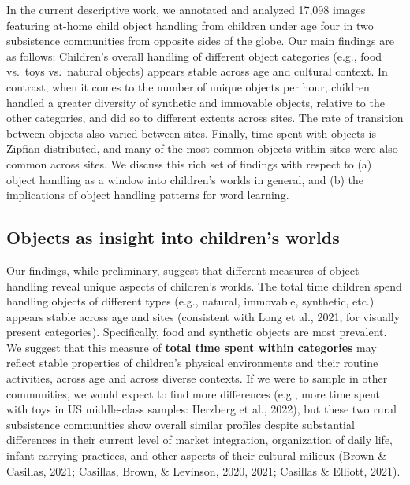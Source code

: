 \documentclass[10pt, letterpaper]{article}
\begin{document}
In the current descriptive work, we annotated and analyzed 17,098 images
featuring at-home child object handling from children under age four in
two subsistence communities from opposite sides of the globe. Our main
findings are as follows: Children's overall handling of different object
categories (e.g., food vs.~toys vs.~natural objects) appears stable
across age and cultural context. In contrast, when it comes to the
number of unique objects per hour, children handled a greater diversity
of synthetic and immovable objects, relative to the other categories,
and did so to different extents across sites. The rate of transition
between objects also varied between sites. Finally, time spent with
objects is Zipfian-distributed, and many of the most common objects
within sites were also common across sites. We discuss this rich set of
findings with respect to (a) object handling as a window into children's
worlds in general, and (b) the implications of object handling patterns
for word learning.

\hypertarget{objects-as-insight-into-childrens-worlds}{%
\subsection{Objects as insight into children's
worlds}\label{objects-as-insight-into-childrens-worlds}}

Our findings, while preliminary, suggest that different measures of
object handling reveal unique aspects of children's worlds. The total
time children spend handling objects of different types (e.g., natural,
immovable, synthetic, etc.) appears stable across age and sites
(consistent with Long et al., 2021, for visually present categories).
Specifically, food and synthetic objects are most prevalent. We suggest
that this measure of \textbf{total time spent within categories} may
reflect stable properties of children's physical environments and their
routine activities, across age and across diverse contexts. If we were
to sample in other communities, we would expect to find more differences
(e.g., more time spent with toys in US middle-class samples: Herzberg et
al., 2022), but these two rural subsistence communities show overall
similar profiles despite substantial differences in their current level
of market integration, organization of daily life, infant carrying
practices, and other aspects of their cultural milieux (Brown \&
Casillas, 2021; Casillas, Brown, \& Levinson, 2020, 2021; Casillas \&
Elliott, 2021).
\end{document}
